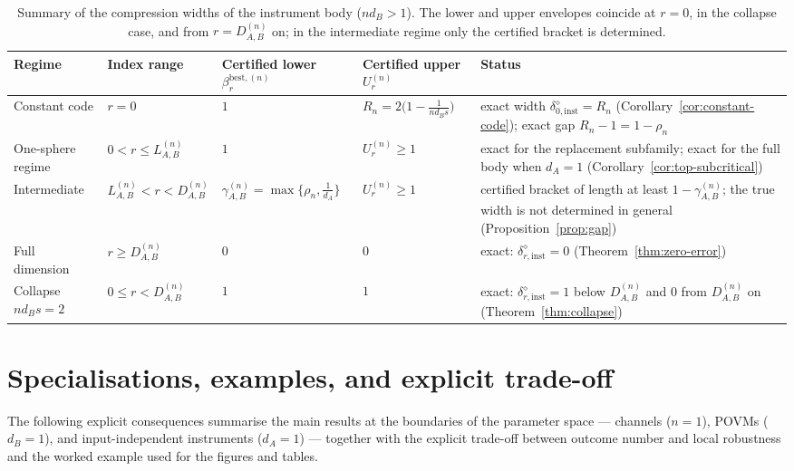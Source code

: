 \documentclass[11pt,a4paper]{article}
\begin{document}
\begin{table}[t]
\centering
\small
\setlength{\tabcolsep}{4pt}
\begin{tabular}{p{3.0cm}p{2.2cm}p{2.6cm}p{2.4cm}p{4.4cm}}
\toprule
Regime & Index range & Certified lower $\beta_r^{\mathrm{best},(n)}$ & Certified upper $U_r^{(n)}$ & Status \\
\midrule
Constant code & $r=0$ & $1$ & $R_n=2\big(1-\frac{1}{nd_Bs}\big)$ & exact width $\delta_{0,\mathrm{inst}}^{\diamond}=R_n$ (Corollary~\ref{cor:constant-code}); exact gap $R_n-1=1-\rho_n$\\
One-sphere regime & $0<r\le L_{A,B}^{(n)}$ & $1$ & $U_r^{(n)}\ge1$ & exact for the replacement subfamily; exact for the full body when $d_A=1$ (Corollary~\ref{cor:top-subcritical})\\
Intermediate & $L_{A,B}^{(n)}<r<D_{A,B}^{(n)}$ & $\gamma_{A,B}^{(n)}=\max\{\rho_n,\tfrac1{d_A}\}$ & $U_r^{(n)}\ge1$ & certified bracket of length at least $1-\gamma_{A,B}^{(n)}$; the true width is not determined in general (Proposition~\ref{prop:gap})\\
Full dimension & $r\ge D_{A,B}^{(n)}$ & $0$ & $0$ & exact: $\delta_{r,\mathrm{inst}}^{\diamond}=0$ (Theorem~\ref{thm:zero-error})\\
Collapse $nd_Bs=2$ & $0\le r<D_{A,B}^{(n)}$ & $1$ & $1$ & exact: $\delta_{r,\mathrm{inst}}^{\diamond}=1$ below $D_{A,B}^{(n)}$ and $0$ from $D_{A,B}^{(n)}$ on (Theorem~\ref{thm:collapse})\\
\bottomrule
\end{tabular}
\caption{Summary of the compression widths of the instrument body ($nd_B>1$). The lower and upper envelopes coincide at $r=0$, in the collapse case, and from $r=D_{A,B}^{(n)}$ on; in the intermediate regime only the certified bracket is determined.}
\label{tab:summary}
\end{table}

\section{Specialisations, examples, and explicit trade-off}
\label{sec:specialisations}

The following explicit consequences summarise the main results at the boundaries of the parameter space --- channels ($n=1$), POVMs ($d_B=1$), and input-independent instruments ($d_A=1$) --- together with the explicit trade-off between outcome number and local robustness and the worked example used for the figures and tables.
\end{document}
